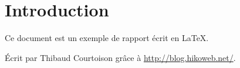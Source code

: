 \section*{Introduction} %

Ce document est un exemple de rapport écrit en \LaTeX.

Écrit par Thibaud Courtoison grâce à \url{http://blog.hikoweb.net/}.
